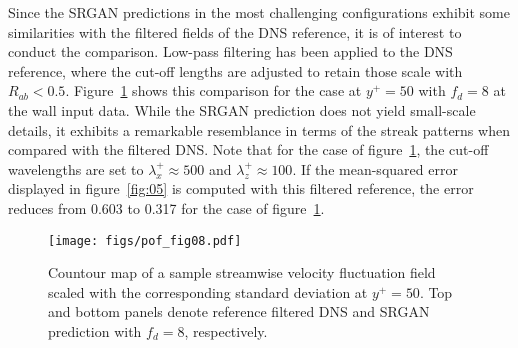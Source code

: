 Since the SRGAN predictions in the most challenging configurations exhibit some similarities with the filtered fields of the DNS reference, it is of interest to conduct the comparison.
Low-pass filtering has been applied to the DNS reference, where the cut-off lengths are adjusted to retain those scale with $R_{ab}<0.5$.
Figure~\ref{fig:08} shows this comparison for the case at $y^+=50$ with $f_d=8$ at the wall input data.
While the SRGAN prediction does not yield small-scale details, it exhibits a remarkable resemblance in terms of the streak patterns when compared with the filtered DNS.
Note that for the case of figure~\ref{fig:08}, the cut-off wavelengths are set to $\lambda_x^+\approx500$ and $\lambda_z^+\approx100$.
If the mean-squared error displayed in figure~\ref{fig:05} is computed with this filtered reference, the error reduces from 0.603 to 0.317 for the case of figure~\ref{fig:08}.
\begin{figure}
  \centerline{\texttt{[image: figs/pof\_fig08.pdf]}}
  \caption{Countour map of a sample streamwise velocity fluctuation field scaled with the corresponding standard deviation at $y^+=50$. Top and bottom panels denote reference filtered DNS and SRGAN prediction with $f_d=8$, respectively.}
\label{fig:08}
\end{figure}


